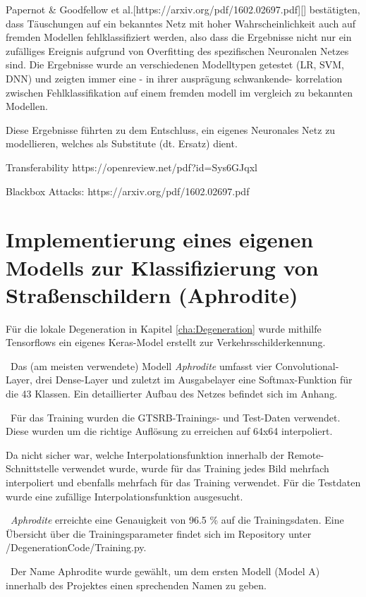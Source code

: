 Papernot \& Goodfellow et al.[https://arxiv.org/pdf/1602.02697.pdf][] bestätigten, dass Täuschungen auf ein bekanntes Netz mit hoher Wahrscheinlichkeit auch auf fremden Modellen fehlklassifiziert werden, also dass die Ergebnisse nicht nur ein zufälliges Ereignis aufgrund von Overfitting des spezifischen Neuronalen Netzes sind. Die Ergebnisse wurde an verschiedenen Modelltypen getestet (LR, SVM, DNN) und zeigten immer eine - in ihrer ausprägung schwankende- korrelation zwischen Fehlklassifikation auf einem fremden modell im vergleich zu bekannten Modellen. 

Diese Ergebnisse führten zu dem Entschluss, ein eigenes Neuronales Netz zu modellieren, welches als Substitute (dt. Ersatz) dient.

Transferability https://openreview.net/pdf?id=Sys6GJqxl

Blackbox Attacks: https://arxiv.org/pdf/1602.02697.pdf

\section{Implementierung eines eigenen Modells zur Klassifizierung von Straßenschildern (Aphrodite)}
Für die lokale Degeneration in Kapitel \ref{cha:Degeneration} wurde mithilfe Tensorflows ein eigenes Keras-Model erstellt zur Verkehrsschilderkennung. 

~\newline Das (am meisten verwendete) Modell \textit{Aphrodite} umfasst vier Convolutional-Layer, drei Dense-Layer und zuletzt im Ausgabelayer eine Softmax-Funktion für die 43 Klassen. Ein detaillierter Aufbau des Netzes befindet sich im Anhang.

~\newline Für das Training wurden die GTSRB-Trainings- und Test-Daten verwendet. Diese wurden um die richtige Auflösung zu erreichen auf 64x64 interpoliert. 

Da nicht sicher war, welche Interpolationsfunktion innerhalb der Remote-Schnittstelle verwendet wurde, wurde für das Training jedes Bild mehrfach interpoliert und ebenfalls mehrfach für das Training verwendet. Für die Testdaten wurde eine zufällige Interpolationsfunktion ausgesucht. 

~\newline \textit{Aphrodite} erreichte eine Genauigkeit von 96.5 \% auf die Trainingsdaten. Eine Übersicht über die Trainingsparameter findet sich im Repository unter /DegenerationCode/Training.py. 

~\newline Der Name Aphrodite wurde gewählt, um dem ersten Modell (Model A) innerhalb des Projektes einen sprechenden Namen zu geben.


